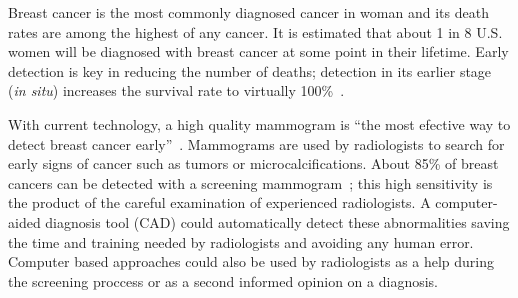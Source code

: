 Breast cancer is the most commonly diagnosed cancer in woman and its death rates are among the highest of any cancer. It is estimated that about 1 in 8 U.S. women will be diagnosed with breast cancer at some point in their lifetime. Early detection is key in reducing the number of deaths; detection in its earlier stage (\textit{in situ}) increases the survival rate to virtually 100\%~\cite{Howlader2014}.

With current technology, a high quality mammogram is ``the most efective way to detect breast cancer early''~\cite{NCI2014}. Mammograms are used by radiologists to search for early signs of cancer such as tumors or microcalcifications. About 85\% of breast cancers can be detected with a screening mammogram~\cite{BCSC2013}; this high sensitivity is the product of the careful examination of experienced radiologists. A computer-aided diagnosis tool (CAD) could automatically detect these abnormalities saving the time and training needed by radiologists and avoiding any human error. Computer based approaches could also be used by radiologists as a help during the screening proccess or as a second informed opinion on a diagnosis.
